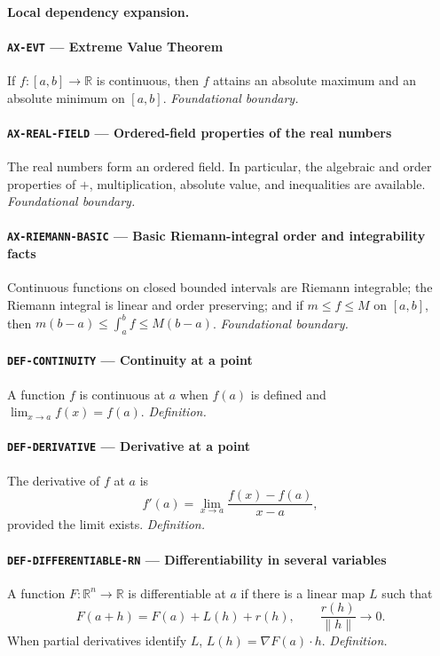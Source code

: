 \documentclass[10pt]{article}
\newcommand{\pidraw}[1]{\begingroup\urlstyle{tt}\nolinkurl{#1}\endgroup}
\theoremstyle{definition}
\theoremstyle{remark}
\begin{document}
\paragraph{Local dependency expansion.}

\paragraph{\pidraw{AX-EVT} --- Extreme Value Theorem}
If $f:[a,b]\to\mathbb{R}$ is continuous, then $f$ attains an absolute maximum and an absolute minimum on $[a,b]$.
\textit{Foundational boundary.}

\paragraph{\pidraw{AX-REAL-FIELD} --- Ordered-field properties of the real numbers}
The real numbers form an ordered field. In particular, the algebraic and order properties of $+$, multiplication, absolute value, and inequalities are available.
\textit{Foundational boundary.}

\paragraph{\pidraw{AX-RIEMANN-BASIC} --- Basic Riemann-integral order and integrability facts}
Continuous functions on closed bounded intervals are Riemann integrable; the Riemann integral is linear and order preserving; and if $m\le f\le M$ on $[a,b]$, then $m(b-a)\le\int_a^b f\le M(b-a)$.
\textit{Foundational boundary.}

\paragraph{\pidraw{DEF-CONTINUITY} --- Continuity at a point}
A function $f$ is continuous at $a$ when $f(a)$ is defined and $\lim_{x\to a}f(x)=f(a)$.
\textit{Definition.}

\paragraph{\pidraw{DEF-DERIVATIVE} --- Derivative at a point}
The derivative of $f$ at $a$ is
\[
f'(a)=\lim_{x\to a}\frac{f(x)-f(a)}{x-a},
\]
provided the limit exists.
\textit{Definition.}

\paragraph{\pidraw{DEF-DIFFERENTIABLE-RN} --- Differentiability in several variables}
A function $F:\mathbb{R}^n\to\mathbb{R}$ is differentiable at $a$ if there is a linear map $L$ such that
\[
F(a+h)=F(a)+L(h)+r(h),\qquad \frac{r(h)}{\|h\|}\to0.
\]
When partial derivatives identify $L$, $L(h)=\nabla F(a)\cdot h$.
\textit{Definition.}
\end{document}

